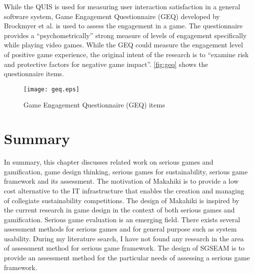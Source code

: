 While the QUIS \cite{harper1993improving} is used for measuring user interaction satisfaction in a general software system, Game Engagement Questionnaire (GEQ) \cite{brockmyer2009development} developed by Brockmyer et al. is used to assess the engagement in a game. The questionnaire provides a ``psychometrically'' strong measure of levels of engagement specifically while playing video games. While the GEQ could measure the engagement level of positive game experience, the original intent of the research is to ``examine risk and protective factors for negative game impact''. \autoref{fig:geq} shows the questionnaire items.

\begin{figure}[ht!]
	\centering
		\texttt{[image: geq.eps]}
		\caption{Game Engagement Questionnaire (GEQ) items \cite{brockmyer2009development}}
		\label{fig:geq}
\end{figure}

\section{Summary}
\label{sec:rel-summary}

In summary, this chapter discusses related work on serious games and gamification, game design thinking, serious games for sustainability, serious game framework and its assessment. The motivation of  Makahiki is to provide a low cost alternative to the IT infrastructure that enables the creation and managing of collegiate sustainability competitions. The design of Makahiki is inspired by the current research in game design in the context of both serious games and gamification. Serious game evaluation is an emerging field. There exists several assessment methods for serious games and for general purpose such as system usability. During my literature search, I have not found any research in the area of assessment method for serious game framework. The design of SGSEAM is to provide an assessment method for the particular needs of assessing a serious game framework.